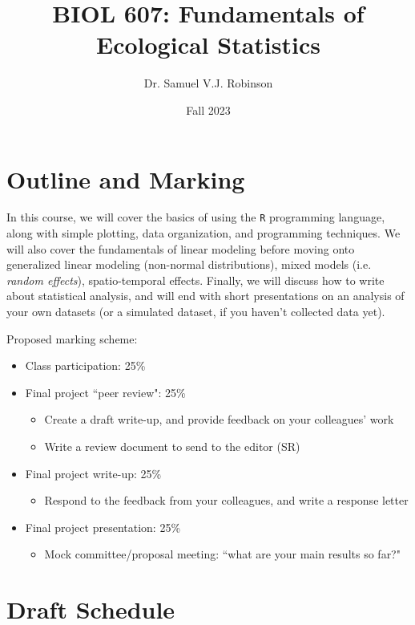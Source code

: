 \documentclass[11pt]{article}
\title{BIOL 607: Fundamentals of Ecological Statistics}
\author{Dr. Samuel V.J. Robinson}
\date{Fall 2023}
\begin{document}
\maketitle

\section*{Outline and Marking}

\large
In this course, we will cover the basics of using the \texttt{R} programming language, along with simple plotting, data organization, and programming techniques. We will also cover the fundamentals of linear modeling before moving onto generalized linear modeling (non-normal distributions), mixed models (i.e. \textit{random effects}), spatio-temporal effects. Finally, we will discuss how to write about statistical analysis, and will end with short presentations on an analysis of your own datasets (or a simulated dataset, if you haven't collected data yet).

\vspace{1cm}

Proposed marking scheme:
\begin{itemize}
  \item Class participation: 25\%
  \item Final project ``peer review": 25\%
  \begin{itemize}
    \item Create a draft write-up, and provide feedback on your colleagues' work
    \item Write a review document to send to the editor (SR)
  \end{itemize}
  \item Final project write-up: 25\%
  \begin{itemize}
    \item Respond to the feedback from your colleagues, and write a response letter
  \end{itemize}
  \item Final project presentation: 25\%
  \begin{itemize}
    \item Mock committee/proposal meeting: ``what are your main results so far?"
  \end{itemize}
\end{itemize}

\clearpage

\section*{Draft Schedule}
\end{document}
